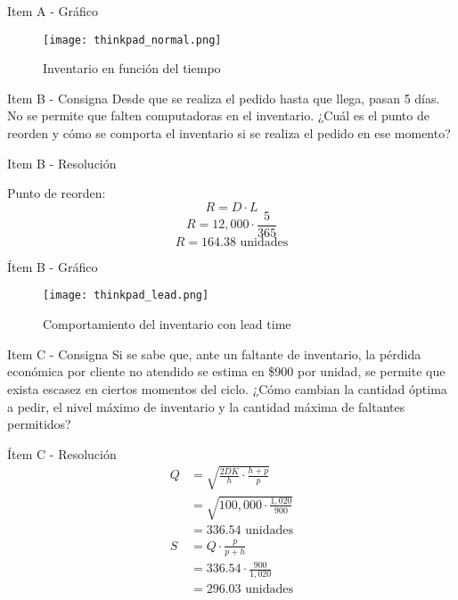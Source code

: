 \documentclass{beamer}
\begin{document}
\begin{frame}{Item A - Gráfico}
\begin{figure}
    \centering
    \texttt{[image: thinkpad\_normal.png]}
    \caption{Inventario en función del tiempo}
\end{figure}
\end{frame}

\begin{frame}{Item B - Consigna}
    Desde que se realiza el pedido hasta que llega, pasan 5 días. No se permite que falten computadoras en el inventario. ¿Cuál es el punto de reorden y cómo se comporta el inventario si se realiza el pedido en ese momento?
\end{frame}

\begin{frame}{Item B - Resolución}
    \begin{center}
        \textcolor{primary}{Punto de reorden:}
        \[ R = D \cdot L \]
        \[ R = 12{,}000 \cdot \frac{5}{365} \]
        \[ R = 164.38 \text{ unidades} \]
    \end{center}
\end{frame}

\begin{frame}{Ítem B - Gráfico}
    \begin{figure}
        \centering
        \texttt{[image: thinkpad\_lead.png]}
        \caption{Comportamiento del inventario con lead time}
    \end{figure}
\end{frame}

\begin{frame}{Item C - Consigna}
    Si se sabe que, ante un faltante de inventario, la pérdida económica por cliente no atendido se estima en \$900 por unidad, se permite que exista escasez en ciertos momentos del ciclo. ¿Cómo cambian la cantidad óptima a pedir, el nivel máximo de inventario y la cantidad máxima de faltantes permitidos?
\end{frame}

\begin{frame}{Ítem C - Resolución}
\begin{align*}
Q &= \sqrt{\frac{2DK}{h} \cdot \frac{h + p}{p}} \\
  &= \sqrt{100{,}000 \cdot \frac{1{,}020}{900}} \\
  &= 336.54 \text{ unidades} \\[1em]
S &= Q \cdot \frac{p}{p + h} \\
  &= 336.54 \cdot \frac{900}{1{,}020} \\
  &= 296.03 \text{ unidades} \\[1em]
\end{align*}
\end{frame}
\end{document}
